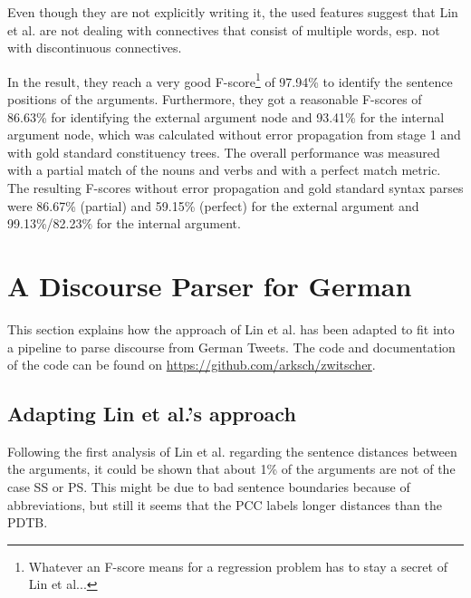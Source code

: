 \documentclass[10pt,a4paper]{article}
\begin{document}
Even though they are not explicitly writing it, the used features suggest that Lin et al. are not dealing with connectives that consist of multiple words, esp. not with discontinuous connectives.

In the result, they reach a very good F-score\footnote{Whatever an F-score means for a regression problem has to stay a secret of Lin et al...} of 97.94\% to identify the sentence positions of the arguments.
Furthermore, they got a reasonable F-scores of 86.63\% for identifying the external argument node and 93.41\% for the internal argument node, which was calculated without error propagation from stage 1 and with gold standard constituency trees.
The overall performance was measured with a partial match of the nouns and verbs and with a perfect match metric. The resulting F-scores without error propagation and gold standard syntax parses were 86.67\% (partial) and 59.15\% (perfect) for the external argument and 99.13\%/82.23\% for the internal argument.


\section{A Discourse Parser for German}

This section explains how the approach of Lin et al. has been adapted to fit into a pipeline to parse discourse from German Tweets. The code and documentation of the code can be found on \url{https://github.com/arksch/zwitscher}.

\subsection{Adapting Lin et al.'s approach}

Following the first analysis of Lin et al. regarding the sentence distances between the arguments, it could be shown that about 1\% of the arguments are not of the case SS or PS. This might be due to bad sentence boundaries because of abbreviations, but still it seems that the PCC labels longer distances than the PDTB.
\end{document}

